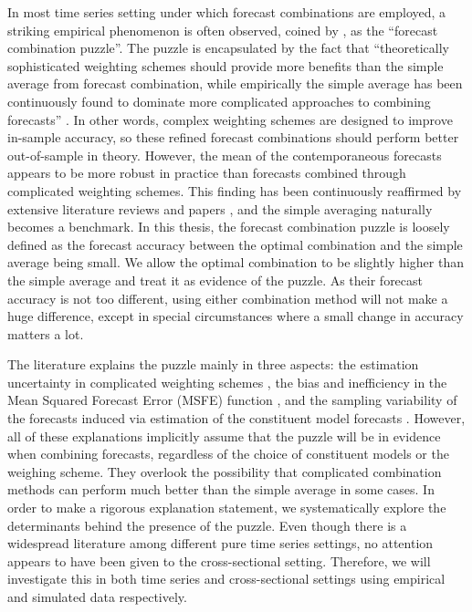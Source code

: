 \documentclass{monashthesis}
\begin{document}
In most time series setting under which forecast combinations are employed, a striking empirical phenomenon is often observed, coined by \textcite{SW04}, as the ``forecast combination puzzle''. The puzzle is encapsulated by the fact that ``theoretically sophisticated weighting schemes should provide more benefits than the simple average from forecast combination, while empirically the simple average has been continuously found to dominate more complicated approaches to combining forecasts'' \autocite{WHLK22}. In other words, complex weighting schemes are designed to improve in-sample accuracy, so these refined forecast combinations should perform better out-of-sample in theory. However, the mean of the contemporaneous forecasts appears to be more robust in practice than forecasts combined through complicated weighting schemes. This finding has been continuously reaffirmed by extensive literature reviews and papers \autocites[e.g.,][]{MACF82,C89,MSA18,MSA20}, and the simple averaging naturally becomes a benchmark. In this thesis, the forecast combination puzzle is loosely defined as the forecast accuracy between the optimal combination and the simple average being small. We allow the optimal combination to be slightly higher than the simple average and treat it as evidence of the puzzle. As their forecast accuracy is not too different, using either combination method will not make a huge difference, except in special circumstances where a small change in accuracy matters a lot.

The literature explains the puzzle mainly in three aspects: the estimation uncertainty in complicated weighting schemes \autocite{SW98,SW04,SW09}, the bias and inefficiency in the Mean Squared Forecast Error (MSFE) function \autocite{E11,CMVW16}, and the sampling variability of the forecasts induced via estimation of the constituent model forecasts \autocite{ZMFP22,FZMP23}. However, all of these explanations implicitly assume that the puzzle will be in evidence when combining forecasts, regardless of the choice of constituent models or the weighing scheme. They overlook the possibility that complicated combination methods can perform much better than the simple average in some cases. In order to make a rigorous explanation statement, we systematically explore the determinants behind the presence of the puzzle. Even though there is a widespread literature among different pure time series settings, no attention appears to have been given to the cross-sectional setting. Therefore, we will investigate this in both time series and cross-sectional settings using empirical and simulated data respectively.
\end{document}
